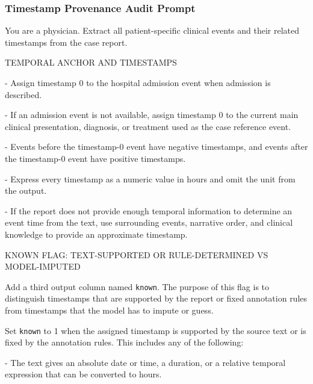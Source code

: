\subsubsection{Timestamp Provenance Audit Prompt}
\label{ch05:apd:timestamp-provenance-prompt}
\begin{tcolorbox}[
  colback=gray!5,
  colframe=gray!100,
  title={Prompt},
  boxrule=2pt,
  enhanced,
  breakable,                %
  before skip=8pt,          %
  after skip=8pt,           %
  pad at break*=2mm,        %
  fontupper=\scriptsize,
  title after break={{Prompt}} %
]
You are a physician. Extract all patient-specific clinical events and their related timestamps from the case report.


TEMPORAL ANCHOR AND TIMESTAMPS


- Assign timestamp 0 to the hospital admission event when admission is described.

- If an admission event is not available, assign timestamp 0 to the current main clinical presentation, diagnosis, or treatment used as the case reference event.

- Events before the timestamp-0 event have negative timestamps, and events after the timestamp-0 event have positive timestamps.

- Express every timestamp as a numeric value in hours and omit the unit from the output.

- If the report does not provide enough temporal information to determine an event time from the text, use surrounding events, narrative order, and clinical knowledge to provide an approximate timestamp.


KNOWN FLAG: TEXT-SUPPORTED OR RULE-DETERMINED VS \\
MODEL-IMPUTED


Add a third output column named \texttt{known}. The purpose of this flag is to distinguish timestamps that are supported by the report or fixed annotation rules from timestamps that the model has to impute or guess.

Set \texttt{known} to 1 when the assigned timestamp is supported by the source text or is fixed by the annotation rules. This includes any of the following:

- The text gives an absolute date or time, a duration, or a relative temporal expression that can be converted to hours.


\end{tcolorbox}
